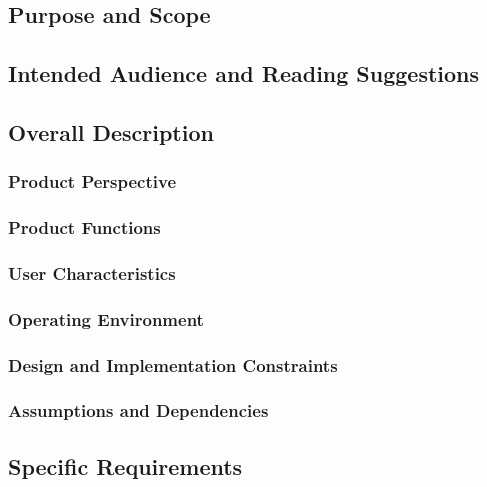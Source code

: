 \documentclass[12pt,a4paper]{report}
\begin{document}
\subsection{Purpose and Scope}

\subsection{Intended Audience and Reading Suggestions}

\subsection{Overall Description}
\subsubsection{Product Perspective}

\subsubsection{Product Functions}

\subsubsection{User Characteristics}

\subsubsection{Operating Environment}

\subsubsection{Design and Implementation Constraints}

\subsubsection{Assumptions and Dependencies}

\subsection{Specific Requirements}
\end{document}
